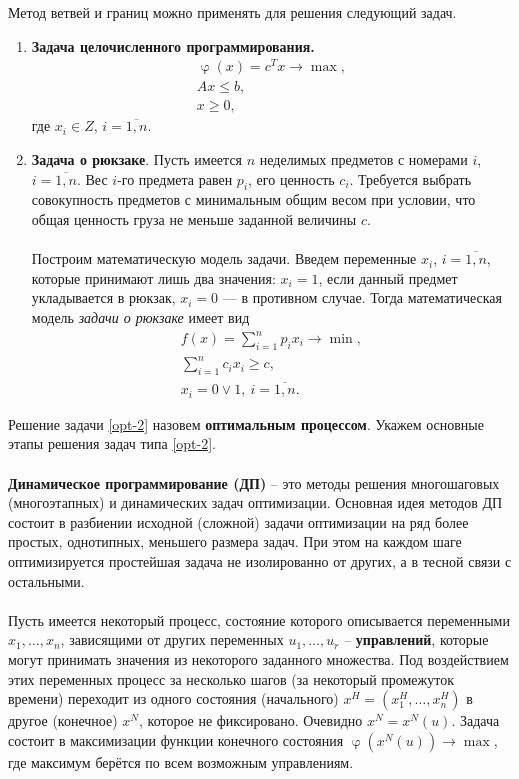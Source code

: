 \documentclass[a4paper, 12pt]{report}
\numberwithin{equation}{section}
\renewcommand{\leq}{\leqslant}
\renewcommand{\geq}{\geqslant}
\renewcommand{\varphi}{\upvarphi}
\begin{document}
	Метод ветвей и границ можно применять для решения следующий задач.
	\begin{enumerate}
		\item \textbf{Задача целочисленного программирования.}
		\begin{equation}
			\begin{gathered}
				\varphi(x) = c^T x \to \max,\\
			Ax \leq b,\\
			x \geq 0,
			\end{gathered}
		\end{equation}
		где $x_i\in Z$, $i = \overline{1,n}$.
		\item \textbf{Задача о рюкзаке}. Пусть имеется $n$ неделимых предметов с номерами $i$, $i = \overline{1,n}$. Вес $i$-го предмета равен $p_i$, его ценность $c_i$. Требуется выбрать совокупность предметов с минимальным общим весом при условии, что общая ценность груза не меньше заданной величины $c$.
		\\\\
		Построим математическую модель задачи. Введем переменные $x_i$, $i = \overline{1,n}$, которые принимают лишь два значения: $x_i = 1$, если данный предмет укладывается в рюкзак, $x_i = 0$ — в противном случае. Тогда математическая модель \textit{задачи о рюкзаке} имеет вид
		\[
		\begin{gathered}
			f(x) = \sum_{i=1}^{n} p_i x_i \to \min, \\ \sum_{i=1}^{n} c_i x_i \geq c, \\ x_i = 0 \vee 1, \ i = \overline{1,n}.
		\end{gathered}
		\]
	\end{enumerate}
Решение задачи \eqref{opt-2} назовем \textbf{оптимальным процессом}.
Укажем основные этапы решения задач типа \eqref{opt-2}.
\\\\
    \textbf{Динамическое программирование (ДП)} -- это методы решения многошаговых
    (многоэтапных) и динамических задач оптимизации. Основная идея методов ДП состоит в разбиении исходной (сложной) задачи
    оптимизации на ряд более простых, однотипных, меньшего размера задач. При этом на
    каждом шаге оптимизируется простейшая задача не изолированно от других, а в тесной
    связи с остальными.
    \\\\
    Пусть имеется некоторый процесс, состояние которого описывается переменными $x_1, \ldots, x_n$, зависящими от других переменных $u_1, \ldots, u_r$ -- \textbf{управлений}, которые могут принимать значения из некоторого заданного множества. Под воздействием этих переменных процесс за несколько шагов (за некоторый промежуток времени) переходит из одного состояния (начального) $x^H = (x^H_1, \ldots, x^H_n)$ в другое (конечное) $x^N$, которое не фиксировано. Очевидно $x^N = x^N(u)$. Задача состоит в максимизации функции конечного состояния $\varphi(x^N(u)) \to \max$, где максимум берётся по всем возможным управлениям.
\end{document}
